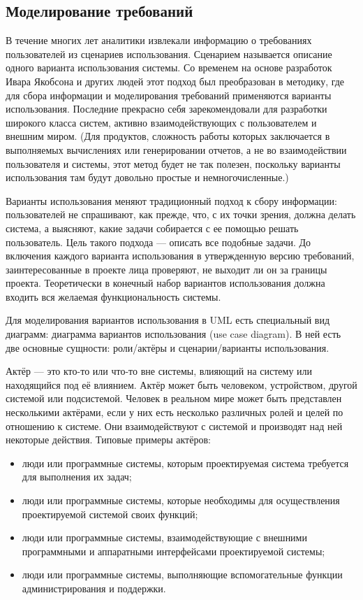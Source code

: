 \documentclass{../../text-style}
\begin{document}
\subsection{Моделирование требований}

В течение многих лет аналитики извлекали информацию о требованиях пользователей из сценариев использования. Сценарием называется описание одного варианта использования системы. Со временем на основе разработок Ивара Якобсона и других людей этот подход был преобразован в методику, где для сбора информации и моделирования требований применяются варианты использования. Последние прекрасно себя зарекомендовали для разработки широкого класса систем, активно взаимодействующих с пользователем и внешним миром. (Для продуктов, сложность работы которых заключается в выполняемых вычислениях или генерировании отчетов, а не во взаимодействии пользователя и системы, этот метод будет не так полезен, поскольку варианты использования там будут довольно простые и немногочисленные.)

Варианты использования меняют традиционный подход к сбору информации: пользователей не спрашивают, как прежде, что, с их точки зрения, должна делать система, а выясняют, какие задачи собирается с ее помощью решать пользователь. Цель такого подхода --- описать все подобные задачи. До включения каждого варианта использования в утвержденную версию требований, заинтересованные в проекте лица проверяют, не выходит ли он за границы проекта. Теоретически в конечный набор вариантов использования должна входить вся желаемая функциональность системы. 

Для моделирования вариантов использования в UML есть специальный вид диаграмм: диаграмма вариантов использования (use case diagram). В ней есть две основные сущности: роли/актёры и сценарии/варианты использования.

Актёр --- это кто-то или что-то вне системы, влияющий на систему или находящийся под её влиянием. Актёр может быть человеком, устройством, другой системой или подсистемой. Человек в реальном мире может быть представлен несколькими актёрами, если у них есть несколько различных ролей и целей по отношению к системе. Они взаимодействуют с системой и производят над ней некоторые действия. Типовые примеры актёров:

\begin{itemize}
    \item люди или программные системы, которым проектируемая система требуется для выполнения их задач; 
    \item люди или программные системы, которые необходимы для осуществления проектируемой системой своих функций;
    \item люди или программные системы, взаимодействующие с внешними программными и аппаратными интерфейсами проектируемой системы;
    \item люди или программные системы, выполняющие вспомогательные функции администрирования и поддержки.
\end{itemize}
\end{document}

